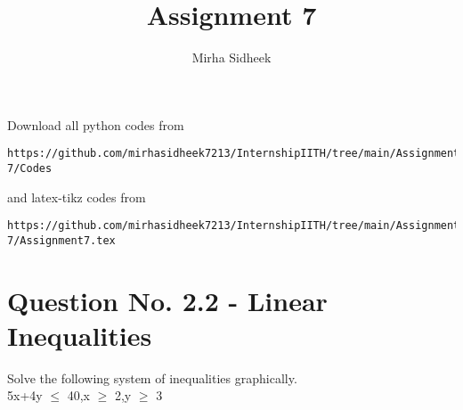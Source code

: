 \documentclass[journal,12pt,twocolumn]{IEEEtran}
\begin{document}
     \def\centbox#1{\makebox[0in]{#1}}
     \def\topbox#1{\raisebox{-\baselineskip}[0in][0in]{#1}}
     \def\midbox#1{\raisebox{-0.5\baselineskip}[0in][0in]{#1}}
\vspace{3cm}
\title{Assignment 7 }
\author{Mirha Sidheek }
\maketitle
\newpage
\bigskip
\renewcommand{\thefigure}{\theenumi}
\renewcommand{\thetable}{\theenumi}
Download all python codes from 
\begin{lstlisting}
https://github.com/mirhasidheek7213/InternshipIITH/tree/main/Assignment-7/Codes
\end{lstlisting}
%
and latex-tikz codes from 
%
\begin{lstlisting}
https://github.com/mirhasidheek7213/InternshipIITH/tree/main/Assignment-7/Assignment7.tex
\end{lstlisting}
%
\section{Question No. 2.2 - Linear Inequalities}
Solve the following system of inequalities graphically.\\
5x+4y $\leq$ 40,x $\geq$ 2,y $\geq$ 3
\end{document}
